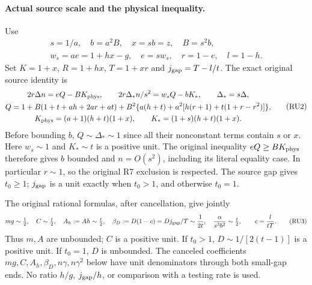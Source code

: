 \paragraph{Actual source scale and the physical inequality.}
Use
\[
 \begin{gathered}
 s=1/a,\quad b=a^2B,\quad x=sb=z,\quad B=s^2b,\\
 w_s=ae=1+hx-g,\quad e=sw_s,\quad r=1-e,\quad l=1-h.
 \end{gathered}
 \tag{RU1}
\]
Set $K=1+x$, $R=1+hx$, $T=1+xr$ and
$j_{\rm gap}=T-l/t$. The exact original source identity is
\[
\begin{gathered}
 2r\Delta n=eQ-BK_{\rm phys},\qquad
 2r\Delta_*n/s^2=w_sQ-bK_*,\qquad \Delta_*=s\Delta,\\
 Q=1+B(1+t+ah+2ar+at)
    +B^2\{a(h+t)+a^2[h(r+1)+t(1+r-r^2)]\},\\
 K_{\rm phys}=(a+1)(h+t)(1+x),\qquad
 K_*=(1+s)(h+t)(1+x).
\end{gathered}                                                     \tag{RU2}
\]
Before bounding $b$, $Q\sim\Delta_*\sim1$ since all their nonconstant
terms contain $s$ or $x$. Here $w_s\sim1$ and $K_*\sim t$ is a
positive unit. The original inequality $eQ\ge BK_{\rm phys}$
therefore gives $b$ bounded and $n=O(s^2)$, including its literal
equality case. In particular $r\sim1$, so the original R7 exclusion
is respected. The source gap gives $t_0\ge1$; $j_{\rm gap}$ is a
unit exactly when $t_0>1$, and otherwise $t_0=1$.

The original rational formulas, after cancellation, give jointly
\[
 mg\sim\tfrac12,\quad C\sim\tfrac t2,\quad
 A_h:=Ah\sim\tfrac t2,\quad
 \beta_D:=D(1-c)=Dj_{\rm gap}/T\sim\frac1{2t},
 \quad \frac\alpha{s^3b^2}\sim\tfrac t2,
 \qquad c=\frac l{tT}.
 \tag{RU3}
\]
Thus $m,A$ are unbounded; $C$ is a positive unit. If $t_0>1$,
$D\sim1/[2(t-1)]$ is a positive unit. If $t_0=1$, $D$ is unbounded.
The canceled coefficients $mg,C,A_h,\beta_D,n\gamma,n\gamma^2$
below have unit denominators through both small-gap ends. No ratio
$h/g$, $j_{\rm gap}/h$, or comparison with a testing rate is used.

